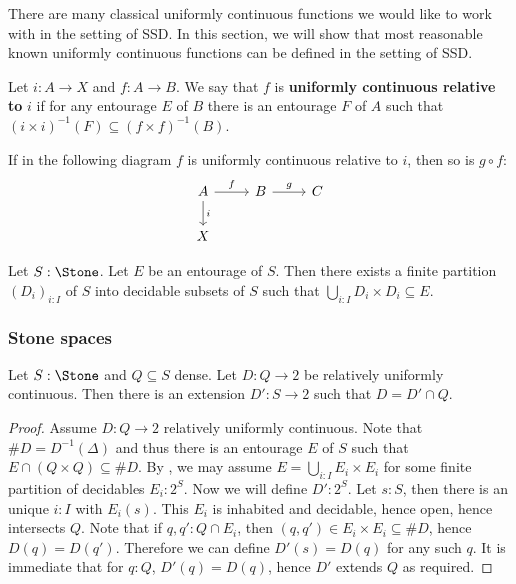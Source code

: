 There are many classical uniformly continuous functions we would like to work with in the setting of SSD. In this section, we will show that most reasonable known uniformly continuous functions can be defined in the setting of SSD. 

\begin{definition}
  Let $i:A \to X$ and $f:A \to B$. We say that $f$ is \textbf{uniformly continuous relative to} $i$ if for any entourage $E$ of $B$ there is an entourage $F$ of $A$ such that $(i\times i)^{-1}(F) \subseteq (f \times f)^{-1}(B)$. 
\end{definition}

\begin{lemma}\label{compRelUniform}
  If in the following diagram $f$ is uniformly continuous relative to $i$, then so is $g \circ f$:
  \begin{equation}
    \begin{tikzcd}
      A \arrow[d,"i"]\arrow[r,"f"]& B \arrow[r,"g"]& C \\ 
      X
    \end{tikzcd}
  \end{equation}
\end{lemma}


\begin{lemma}\label{EntouragesStone}
  Let $S:\Stone$. Let $E$ be an entourage of $S$. Then there exists a finite partition $(D_i)_{i:I}$ of $S$ into decidable subsets of $S$ such that $\bigcup_{i:I}D_i \times D_i \subseteq E$. 
\end{lemma}

\subsubsection{Stone spaces}
\begin{lemma}\label{UniformDecidableExtension}
  Let $S:\Stone$ and $Q\subseteq S$ dense. Let $D:Q \to 2$ be relatively uniformly continuous. Then there is an extension $D' : S \to 2$ such that $D = D' \cap Q$. 
\end{lemma}
\begin{proof}
  Assume $D:Q \to 2$ relatively uniformly continuous. Note that $\#D = D^{-1}(\Delta)$ and thus there is an entourage $E$ of $S$ such that $E \cap (Q \times Q) \subseteq \#D$. By , we may assume $E = \bigcup_{i:I} E_i \times E_i$ for some finite partition of decidables $E_i:2^S$. 
  Now we will define $D':2^S$. Let $s:S$, then there is an unique $i:I$ with $E_i(s)$. 
  This $E_i$ is inhabited and decidable, hence open, hence intersects $Q$. 
  Note that if $q,q':Q\cap E_i$, then $(q,q')\in E_i \times E_i \subseteq \#D$, hence $D(q) = D(q')$. 
  Therefore we can define $D'(s) = D(q)$ for any such $q$. 
  It is immediate that for $q:Q$, $D'(q) = D(q)$, hence $D'$ extends $Q$ as required. 
\end{proof}

